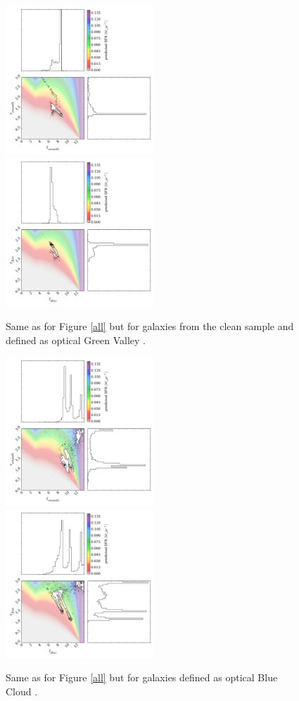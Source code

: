 \documentclass{mn2e}
\begin{document}
\begin{figure}
\includegraphics[width=0.4975\textwidth]{gv_smooth_clean.pdf}
\includegraphics[width=0.4975\textwidth]{gv_disc_clean.pdf}
\caption{Same as for Figure \ref{all} but for galaxies from the clean sample and defined as optical Green Valley \cite{Baldry}.}
\label{gv_clean}
\end{figure}


\begin{figure}
\includegraphics[width=0.4975\textwidth]{blue_c_smooth.pdf}
\includegraphics[width=0.4975\textwidth]{blue_c_disc.pdf}
\caption{Same as for Figure \ref{all} but for galaxies defined as optical Blue Cloud \cite{Baldry}.}
\label{blue_c}
\end{figure}
\end{document}
